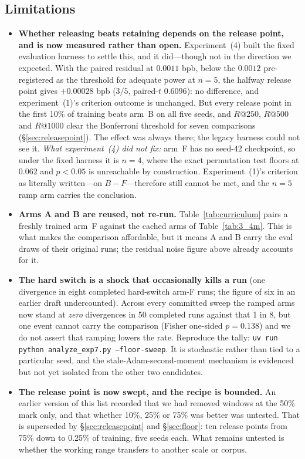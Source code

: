 \documentclass[11pt,a4paper]{article}
\begin{document}
\subsection{Limitations}

\begin{itemize}
    \item \textbf{Whether releasing beats retaining depends on the release point, and is now measured rather than open.} Experiment~(4) built the fixed evaluation harness to settle this, and it did---though not in the direction we expected. With the paired residual at $0.0011$ bpb, below the $0.0012$ pre-registered as the threshold for adequate power at $n=5$, the halfway release point gives $+0.00028$ bpb ($3/5$, paired-$t$ $0.6096$): no difference, and experiment~(1)'s criterion outcome is unchanged. But every release point in the first 10\% of training beats arm~B on all five seeds, and $R@250$, $R@500$ and $R@1000$ clear the Bonferroni threshold for seven comparisons (\S\ref{sec:releasepoint}). The effect was always there; the legacy harness could not see it. \emph{What experiment~(4) did not fix:} arm~F has no seed-42 checkpoint, so under the fixed harness it is $n=4$, where the exact permutation test floors at $0.062$ and $p<0.05$ is unreachable by construction. Experiment~(1)'s criterion as literally written---on $B-F$---therefore still cannot be met, and the $n=5$ ramp arm carries the conclusion.
    \item \textbf{Arms A and B are reused, not re-run.} Table~\ref{tab:curriculum} pairs a freshly trained arm~F against the cached arms of Table~\ref{tab:3_4m}. This is what makes the comparison affordable, but it means A and B carry the eval draws of their original runs; the residual noise figure above already accounts for it.
    \item \textbf{The hard switch is a shock that occasionally kills a run} (one divergence in eight completed hard-switch arm-F runs; the figure of six in an earlier draft undercounted). Across every committed sweep the ramped arms now stand at \emph{zero} divergences in 50 completed runs against that 1 in 8, but one event cannot carry the comparison (Fisher one-sided $p=0.138$) and we do not assert that ramping lowers the rate. Reproduce the tally: \texttt{uv run python analyze\_exp7.py --floor-sweep}. It is stochastic rather than tied to a particular seed, and the stale-Adam-second-moment mechanism is evidenced but not yet isolated from the other two candidates.
    \item \textbf{The release point is now swept, and the recipe is bounded.} An earlier version of this list recorded that we had removed windows at the 50\% mark only, and that whether 10\%, 25\% or 75\% was better was untested. That is superseded by \S\ref{sec:releasepoint} and \S\ref{sec:floor}: ten release points from 75\% down to 0.25\% of training, five seeds each. What remains untested is whether the working range transfers to another scale or corpus.

\end{itemize}
\end{document}
